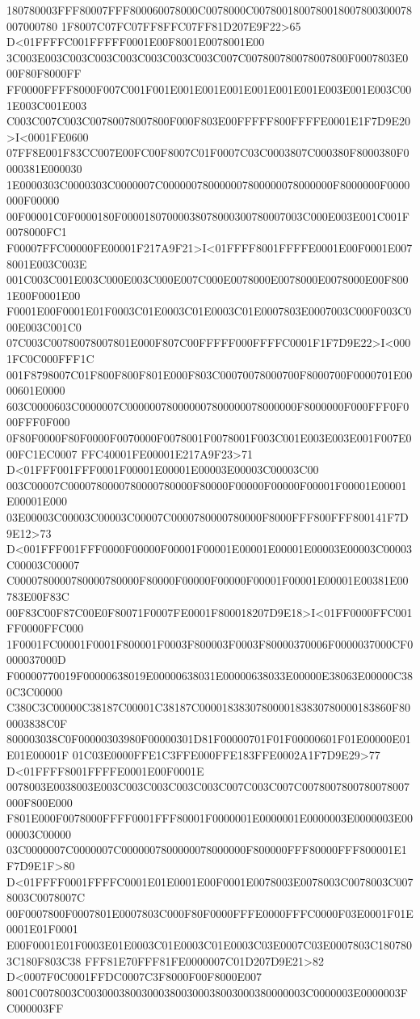 180780003FFF80007FFF800060078000C0078000C0078001800780018007800300078007000780
1F8007C07FC07FF8FFC07FF81D207E9F22>65 D<01FFFFC001FFFFF0001E00F8001E0078001E00
3C003E003C003C003C003C003C003C003C007C007800780078007800F0007803E000F80F8000FF
FF0000FFFF8000F007C001F001E001E001E001E001E001E001E003E001E003C001E003C001E003
C003C007C003C00780078007800F000F803E00FFFFF800FFFFE0001E1F7D9E20>I<0001FE0600
07FF8E001F83CC007E00FC00F8007C01F0007C03C0003807C000380F8000380F0000381E000030
1E0000303C0000303C0000007C000000780000007800000078000000F8000000F0000000F00000
00F00001C0F0000180F00001807000038078000300780007003C000E003E001C001F0078000FC1
F00007FFC00000FE00001F217A9F21>I<01FFFF8001FFFFE0001E00F0001E0078001E003C003E
001C003C001E003C000E003C000E007C000E0078000E0078000E0078000E00F8001E00F0001E00
F0001E00F0001E01F0003C01E0003C01E0003C01E0007803E0007003C000F003C000E003C001C0
07C003C00780078007801E000F807C00FFFFF000FFFFC0001F1F7D9E22>I<0001FC0C000FFF1C
001F8798007C01F800F800F801E000F803C00070078000700F8000700F0000701E0000601E0000
603C0000603C0000007C000000780000007800000078000000F8000000F000FFF0F000FFF0F000
0F80F0000F80F0000F0070000F0078001F0078001F003C001E003E003E001F007E000FC1EC0007
FFC40001FE00001E217A9F23>71 D<01FFF001FFF0001F00001E00001E00003E00003C00003C00
003C00007C0000780000780000780000F80000F00000F00000F00001F00001E00001E00001E000
03E00003C00003C00003C00007C0000780000780000F8000FFF800FFF800141F7D9E12>73
D<001FFF001FFF0000F00000F00001F00001E00001E00001E00003E00003C00003C00003C00007
C0000780000780000780000F80000F00000F00000F00001F00001E00001E00381E00783E00F83C
00F83C00F87C00E0F80071F0007FE0001F800018207D9E18>I<01FF0000FFC001FF0000FFC000
1F0001FC00001F0001F800001F0003F800003F0003F80000370006F0000037000CF0000037000D
F00000770019F00000638019E00000638031E00000638033E00000E38063E00000C380C3C00000
C380C3C00000C38187C00001C38187C0000183830780000183830780000183860F800003838C0F
800003038C0F00000303980F00000301D81F00000701F01F00000601F01E00000E01E01E00001F
01C03E0000FFE1C3FFE000FFE183FFE0002A1F7D9E29>77 D<01FFFF8001FFFFE0001E00F0001E
0078003E0038003E003C003C003C003C003C007C003C007C0078007800780078007000F800E000
F801E000F0078000FFFF0001FFF80001F0000001E0000001E0000003E0000003E0000003C00000
03C0000007C0000007C0000007800000078000000F800000FFF80000FFF800001E1F7D9E1F>80
D<01FFFF0001FFFFC0001E01E0001E00F0001E0078003E0078003C0078003C0078003C0078007C
00F0007800F0007801E0007803C000F80F0000FFFE0000FFFC0000F03E0001F01E0001E01F0001
E00F0001E01F0003E01E0003C01E0003C01E0003C03E0007C03E0007803C1807803C180F803C38
FFF81E70FFF81FE0000007C01D207D9E21>82 D<0007F0C0001FFDC0007C3F8000F00F8000E007
8001C0078003C003000380030003800300038003000380000003C0000003E0000003FC000003FF
